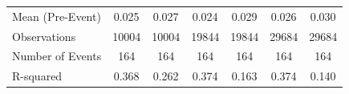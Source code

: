 {\begin{tabular}{l*{6}{c}}
\midrule
Mean (Pre-Event)&       0.025         &       0.027         &       0.024         &       0.029         &       0.026         &       0.030         \\
Observations&       10004         &       10004         &       19844         &       19844         &       29684         &       29684         \\
Number of Events&         164         &         164         &         164         &         164         &         164         &         164         \\
R-squared   &       0.368         &       0.262         &       0.374         &       0.163         &       0.374         &       0.140         \\
\bottomrule
\end{tabular}
}
